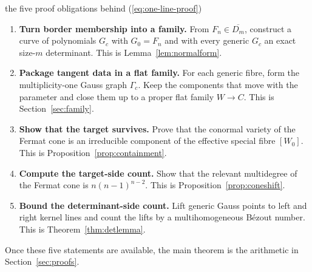 \documentclass[acmsmall,screen,nonacm]{acmart}
\theoremstyle{definition}
\theoremstyle{remark}
\begin{document}
\begin{roadmapbox}{the five proof obligations behind (\ref*{eq:one-line-proof})}
\begin{enumerate}[leftmargin=2.2em,itemsep=2pt]
\item \textbf{Turn border membership into a family.}  From
$F_n\in\overline{D_m}$, construct a curve of polynomials $G_c$ with
$G_0=F_n$ and with every generic $G_c$ an exact size-$m$ determinant.
This is Lemma~\ref{lem:normalform}.
\item \textbf{Package tangent data in a flat family.}  For each generic
fibre, form the multiplicity-one Gauss graph $\Gamma_c$.  Keep the
components that move with the parameter and close them up to a proper flat
family $W\to C$.  This is Section~\ref{sec:family}.
\item \textbf{Show that the target survives.}  Prove that the conormal
variety of the Fermat cone is an irreducible component of the effective
special fibre $[W_0]$.  This is Proposition~\ref{prop:containment}.
\item \textbf{Compute the target-side count.}  Show that the relevant
multidegree of the Fermat cone is $n(n-1)^{n-2}$.  This is
Proposition~\ref{prop:coneshift}.
\item \textbf{Bound the determinant-side count.}  Lift generic Gauss
points to left and right kernel lines and count the lifts by a
multihomogeneous B\'ezout number.  This is
Theorem~\ref{thm:detlemma}.
\end{enumerate}
Once these five statements are available, the main theorem is the arithmetic
in Section~\ref{sec:proofs}.
\end{roadmapbox}
\end{document}
